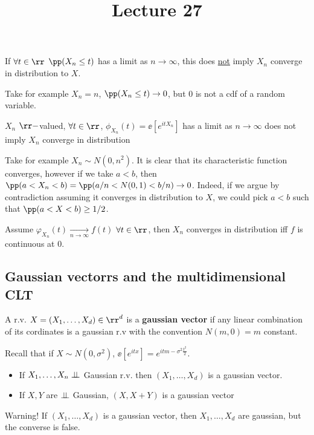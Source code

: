 \documentclass[../main.tex]{subfiles}
\title{Lecture 27}
\begin{document}
\begin{obs}
  If $\forall t \in \rr$ $\pp(X_n \leq t)$ has a limit as $n \to \infty$, this
  does \underline{not} imply $X_n$ converge in distribution to $X$.

  Take for example $X_n = n$, $\pp(X_n \leq t) \to 0$, but $0$ is not a cdf of
  a random variable.
\end{obs}
\begin{obs}
  $X_n$ $\rr-$valued, $\forall t \in \rr$, $\phi_{X_n}(t) = \ee[e^{itX_n}]$ has
  a limit as $n \to \infty$ does not imply $X_n$ converge in distribution

  Take for example $X_n \sim N(0, n^2)$. It is clear that its characteristic
  function converges, however if we take $a < b$, then $\pp(a < X_n < b) =
  \pp(a/n < N(0, 1) < b/n) \to 0$. Indeed, if we argue by contradiction assuming
  it converges in distribution to $X$, we could pick $a < b$ such that $\pp(a <
  X < b) \geq 1/2$.
\end{obs}
\begin{remark}
  Assume $\varphi_{X_n}(t) \underset{n \to \infty}{\longrightarrow} f(t)$ $\forall
  t \in \rr$, then $X_n$ converges in distribution iff $f$ is continuous at $0$.
\end{remark}

\subsection{Gaussian vectorrs and the multidimensional CLT}
\begin{definition}
  A r.v. $X = (X_1, \ldots, X_d) \in \rr^d$ is a \textbf{gaussian vector} if any
  linear combination of its cordinates is a gaussian r.v with the convention
  $N(m, 0) = m$ constant.
\end{definition}

Recall that if $X \sim N(0, \sigma^2)$, $\ee[e^{itx}] = e^{itm - \sigma^2
\frac{t^2}{2}} $.

\begin{example}
    \hfill
    \begin{itemize}
      \item If $X_1, \ldots, X_n \perp\!\!\!\!\,\perp$ Gaussian r.v. then $(X_1,\ldots,X_d)$
        is a gaussian vector.
      \item If $X, Y$ are $\perp\!\!\!\!\,\perp$ Gaussian, $(X, X+Y)$ is a gaussian vector
    \end{itemize}
\end{example}
{\color{red} Warning!} If $(X_1, \ldots, X_d)$ is a gaussian vector, then $X_1,
\ldots, X_d$ are gaussian, but the converse is false.
\end{document}
